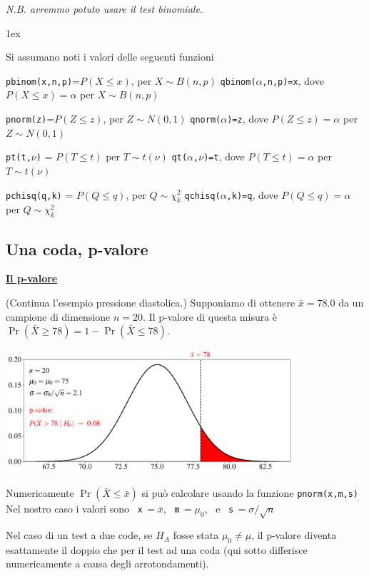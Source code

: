\documentclass[11pt,openany]{book}
\begin{document}
\textit{N.B. avremmo potuto usare il test binomiale.}

\parskip1ex
{\hrulefill\scriptsize

Si assumano noti i valori delle seguenti funzioni

{\tt pbinom(x,n,p)}=$P(X\le x)$, per $X\sim B(n,p)$
\hfill 
{\tt qbinom($\alpha$,n,p)=x},  dove $P(X\le x)=\alpha$ per $X\sim B(n,p)$

{\tt pnorm(z)}=$P(Z\le z)$, per $Z\sim N(0,1)$
\hfill 
{\tt qnorm($\alpha$)=z},  dove $P(Z\le z)=\alpha$ per $Z\sim N(0,1)$

{\tt pt(t,$\nu$)} = $P(T\le t)$ per $T\sim t(\nu)$
\hfill
{\tt qt($\alpha$,$\nu$)=t}, dove $P(T\le t)=\alpha$ per $T\sim t(\nu)$

{\tt pchisq(q,k)} = $P(Q\le q)$, per $Q\sim \chi^2_k$
\hfill
{\tt qchisq($\alpha$,k)=q},  dove $P(Q\le q)=\alpha$ per $Q\sim \chi^2_k$
\par
}


\hfill{}\clearpage\subsection{Una coda, p-valore}
\hfill\textbf{{\color{brown}\hyperref[pvalore]{Il p-valore \faShare}}}

(Continua l'esempio pressione diastolica.) Supponiamo di ottenere $\bar x=78.0$ da un campione di dimensione $n=20$. Il p-valore di questa misura è $\Pr(\bar X\ge 78)=1-\Pr(\bar X\le 78)$.

\hfil\includegraphics[width=0.8\textwidth]{figure/Z-test-p-val_01.pdf}

Numericamente $\Pr(\bar X\le \bar x)$ si può calcolare usando la funzione {\tt pnorm(x,m,s)} Nel nostro caso i valori sono \ {\tt x}$\,=\bar x$,  \ {\tt m}$\,=\mu_0$, \ e  \ {\tt s}$\,=\sigma/\sqrt{n}$

Nel caso di un test a due code, se $H_A$ fosse stata $\mu_0\neq\mu$, il p-valore diventa esattamente il doppio che per il test ad una coda (qui sotto differisce numericamente a causa degli arrotondamenti). 
\end{document}
